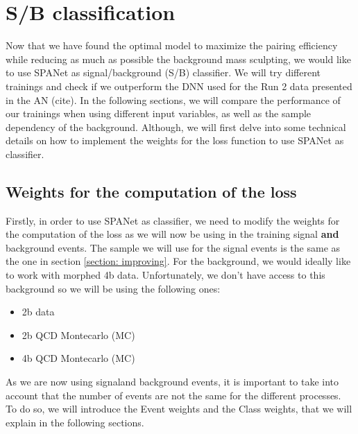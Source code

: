 \section{S/B classification} \label{section: s/b classification}



Now that we have found the optimal model to maximize the pairing efficiency while 
reducing as much as possible the background mass sculpting,
we would like to use SPANet as signal/background (S/B) classifier. We will try different trainings and check if we outperform the DNN used for the Run 2 data presented in the AN (cite). In the following sections, we will compare the performance of our trainings when using different input variables, as well as the sample dependency of the background. Although, we will first delve into some technical details on how to implement the weights for the loss function to use SPANet as classifier.


\subsection{Weights for the computation of the loss}

Firstly, in order to use SPANet as classifier, we need to modify the weights for the computation of the loss as we will now be using in the training signal \textbf{and} background events. The sample we will use for the signal events is the same as the one in section \ref{section: improving}.  For the background, we would ideally like to work with morphed 4b data. Unfortunately, we don't have access to this background so we will be using the following ones:
\begin{itemize}
	\item 2b data
	\item 2b QCD Montecarlo (MC)
    \item 4b QCD Montecarlo (MC)
\end{itemize}
As we are now using signal{and} background events, it is important to take into account that the number of events are not the same for the different processes. To do so, we will introduce the {Event weights} and the {Class weights}, that we will explain in the following sections.


